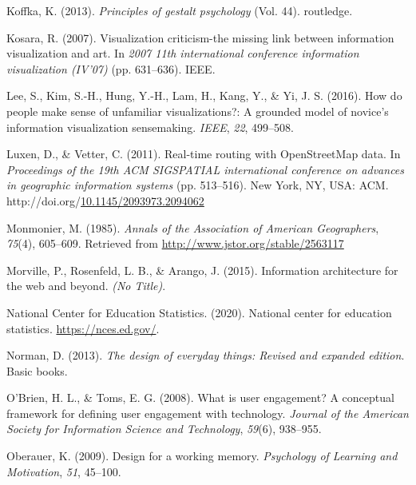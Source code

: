 \documentclass[print]{nuthesis}
\newlength{\cslhangindent}
\newenvironment{CSLReferences}[2]%
{\setlength{\parindent}{0pt}%
\everypar{\setlength{\hangindent}{\cslhangindent}}\ignorespaces}%
{\par}
\begin{document}
\begin{CSLReferences}{1}{0}
\leavevmode{}%
Koffka, K. (2013). \emph{Principles of gestalt psychology} (Vol. 44). routledge.

\leavevmode{}%
Kosara, R. (2007). Visualization criticism-the missing link between information visualization and art. In \emph{2007 11th international conference information visualization (IV'07)} (pp. 631--636). IEEE.

\leavevmode{}%
Lee, S., Kim, S.-H., Hung, Y.-H., Lam, H., Kang, Y., \& Yi, J. S. (2016). How do people make sense of unfamiliar visualizations?: A grounded model of novice's information visualization sensemaking. \emph{IEEE}, \emph{22}, 499--508.

\leavevmode{}%
Luxen, D., \& Vetter, C. (2011). Real-time routing with OpenStreetMap data. In \emph{Proceedings of the 19th ACM SIGSPATIAL international conference on advances in geographic information systems} (pp. 513--516). New York, NY, USA: ACM. http://doi.org/\href{https://doi.org/10.1145/2093973.2094062}{10.1145/2093973.2094062}

\leavevmode{}%
Monmonier, M. (1985). \emph{Annals of the Association of American Geographers}, \emph{75}(4), 605--609. Retrieved from \url{http://www.jstor.org/stable/2563117}

\leavevmode{}%
Morville, P., Rosenfeld, L. B., \& Arango, J. (2015). Information architecture for the web and beyond. \emph{(No Title)}.

\leavevmode{}%
National Center for Education Statistics. (2020). National center for education statistics. \url{https://nces.ed.gov/}.

\leavevmode{}%
Norman, D. (2013). \emph{The design of everyday things: Revised and expanded edition}. Basic books.

\leavevmode{}%
O'Brien, H. L., \& Toms, E. G. (2008). What is user engagement? A conceptual framework for defining user engagement with technology. \emph{Journal of the American Society for Information Science and Technology}, \emph{59}(6), 938--955.

\leavevmode{}%
Oberauer, K. (2009). Design for a working memory. \emph{Psychology of Learning and Motivation}, \emph{51}, 45--100.


\end{CSLReferences}
\end{document}
